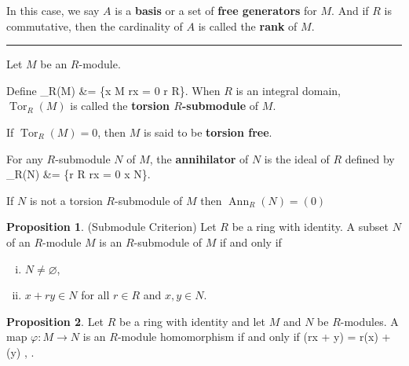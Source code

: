 \documentclass[12pt]{article}
\newcommand{\keyword}[1]{\textbf{#1}}
\def\[#1\]{\begin{align*}#1\end{align*}}
\newcommand{\sepline}{\rule{\textwidth}{0.4pt}}
\theoremstyle{definition}
\newtheorem{proposition}{Proposition}
\newcommand{\tc}[1]{, \qquad \text{#1}}
\renewcommand{\phi}{\varphi}
\renewcommand{\emptyset}{\varnothing}
\newcommand{\<}{\left\langle}
\renewcommand{\>}{\right\rangle}
\DeclareMathOperator{\Tor}{Tor}
\DeclareMathOperator{\Ann}{Ann}
\begin{document}
In this case, we say $A$ is a \keyword{basis} or a set of \keyword{free generators} for $M$. And if $R$ is commutative, then the cardinality of $A$ is called the \keyword{rank} of $M$.

\sepline

Let $M$ be an $R$-module.

Define 
\[
    \Tor_R(M) &= \{x \in M \mid rx = 0  r \in R\}.
\]
When $R$ is an integral domain, $\Tor_R(M)$ is called the \keyword{torsion $R$-submodule} of $M$.

If $\Tor_R(M) = 0$, then $M$ is said to be \keyword{torsion free}.

For any $R$-submodule $N$ of $M$, the \keyword{annihilator} of $N$ is the ideal of $R$ defined by
\[
    \Ann_R(N) &= \{r \in R \mid rx = 0  x \in N\}.
\]

If $N$ is not a torsion $R$-submodule of $M$ then $\Ann_R(N) = (0)$









\newpage

\begin{proposition}(Submodule Criterion)
    Let $R$ be a ring with identity. A subset $N$ of an $R$-module $M$ is an $R$-submodule of $M$ if and only if
    \begin{enumerate}[(i)]
        \item $N \ne \emptyset$,
        \item $x + ry \in N$ for all $r \in R$ and $x, y \in N$.
    \end{enumerate}
\end{proposition}

\begin{proposition}
    Let $R$ be a ring with identity and let $M$ and $N$ be $R$-modules. A map $\phi : M \to N$ is an $R$-module homomorphism if and only if
    \[
        \phi(rx + y) = r\phi(x) + \phi(y) \tc{for all $x, y \in M$, $r \in R$}.
    \]
\end{proposition}
\end{document}
